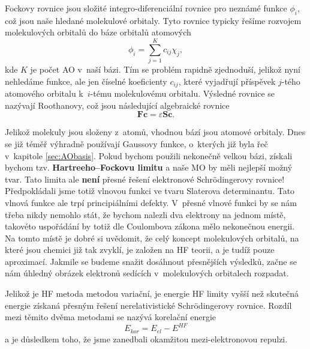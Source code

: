 Fockovy rovnice jsou složité integro-diferenciální rovnice pro neznámé funkce $\phi_i$,
což jsou naše hledané molekulové orbitaly.
Tyto rovnice typicky řešíme rozvojem molekulových orbitalů do báze orbitalů atomových
\begin{equation}
\phi_i=\sum_{j=1}^K c_{ij} \chi_j ,
\end{equation}
kde $K$ je počet AO v~naší bázi. Tím se problém rapidně zjednoduší, jelikož nyní nehledáme funkce, ale jen číselné koeficienty $c_{ij}$, které vyjadřují příspěvek $j$-tého atomového orbitalu k~$i$-tému molekulovému orbitalu.
Výsledné rovnice se nazývají Roothanovy, což jsou následující algebraické rovnice
\begin{equation}
\mathbf{F} \mathbf{c} = \varepsilon \mathbf{S} \mathbf{c} .
\end{equation}

Jelikož molekuly jsou složeny z~atomů, vhodnou bází jsou atomové orbitaly.
Dnes se již téměř výhradně používají Gaussovy funkce, o~kterých již byla řeč v~kapitole \ref{sec:AObasis}.
Pokud bychom použili nekonečně velkou bázi, získali bychom tzv. \textbf{Hartreeho--Fockovu limitu} a naše MO by měli nejlepší možný tvar. Tato limita ale \textbf{není} přesné řešení elektronové Schr\"{o}dingerovy rovnice!
Předpokládali jsme totiž vlnovou funkci ve tvaru Slaterova determinantu. Tato vlnová funkce ale trpí principiálními defekty. V~přesné vlnové funkci by se nám třeba nikdy nemohlo stát, že bychom nalezli dva elektrony na jednom místě, takovéto uspořádání by totiž dle Coulombova zákona mělo nekonečnou energii.
Na tomto místě je dobré si uvědomit, že celý koncept molekulových orbitalů, na které jsou chemici již tak zvyklí, je založen na HF teorii, a je tudíž pouze aproximací. Jakmile se budeme snažit dosáhnout přesnějších výsledků, začne se nám úhledný obrázek elektronů sedících v~molekulových orbitalech rozpadat.

Jelikož je HF metoda metodou variační, je energie HF limity vyšší než skutečná energie získaná přesným řešení nerelativistické Schr\"{o}dingerovy rovnice.
Rozdíl mezi těmito dvěma metodami se nazývá korelační energie
\begin{equation}
E_{kor}=E_{el} - E^{HF}
\end{equation}
a je důsledkem toho, že jsme zanedbali okamžitou mezi-elektronovou repulzi.



